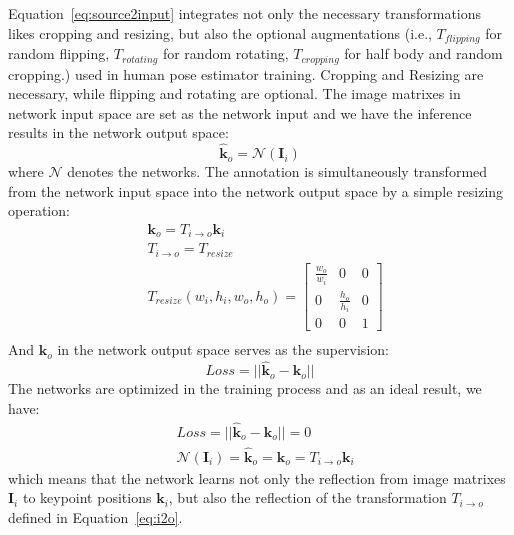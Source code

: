 \documentclass[10pt,journal,compsoc]{IEEEtran}
\begin{document}
Equation~\ref{eq:source2input} integrates not only the necessary transformations likes cropping and resizing, but also the optional augmentations (i.e., $T_{flipping}$ for random flipping, $T_{rotating}$ for random rotating, $T_{cropping}$ for half body and random cropping.) used in human pose estimator training. Cropping and Resizing are necessary, while flipping and rotating are optional. The image matrixes in network input space are set as the network input and we have the inference results in the network output space:
\begin{equation}
\label{eq:networkpredict}
    \hat{\textbf{k}}_o = \mathcal{N}(\textbf{I}_i)
\end{equation}
where $\mathcal{N}$ denotes the networks. The annotation is simultaneously transformed from the network input space into the network output space by a simple resizing operation:
\begin{equation}
\label{eq:i2o}
    \begin{split}
    &\textbf{k}_o = T_{i\rightarrow o}\textbf{k}_i \\
    &T_{i\rightarrow o} = T_{resize}\\
    &T_{resize}(w_i,h_i,w_o,h_o)=\begin{bmatrix} \frac{w_o}{w_i} & 0 & 0 \\
                    0 & \frac{h_o}{h_i} & 0 \\
                    0 & 0 &1 \end{bmatrix}\\
    \end{split}
\end{equation}
And $\textbf{k}_o$ in the network output space serves as the supervision:
\begin{equation}
    \label{eq:loss}
    Loss = ||\hat{\textbf{k}}_o-\textbf{k}_o||
\end{equation}
The networks are optimized in the training process and as an ideal result, we have:
\begin{equation}
\label{eq:assumption}
    \begin{split}
    &Loss = ||\hat{\textbf{k}}_o-\textbf{k}_o|| = 0\\
    &\mathcal{N}(\textbf{I}_i) = \hat{\textbf{k}}_o = \textbf{k}_o = T_{i\rightarrow o}\textbf{k}_i
    \end{split}
\end{equation}
which means that the network learns not only the reflection from image matrixes $\textbf{I}_i$ to keypoint positions $\textbf{k}_i$, but also the reflection of the transformation $T_{i\rightarrow o}$ defined in Equation~\ref{eq:i2o}.
\end{document}

